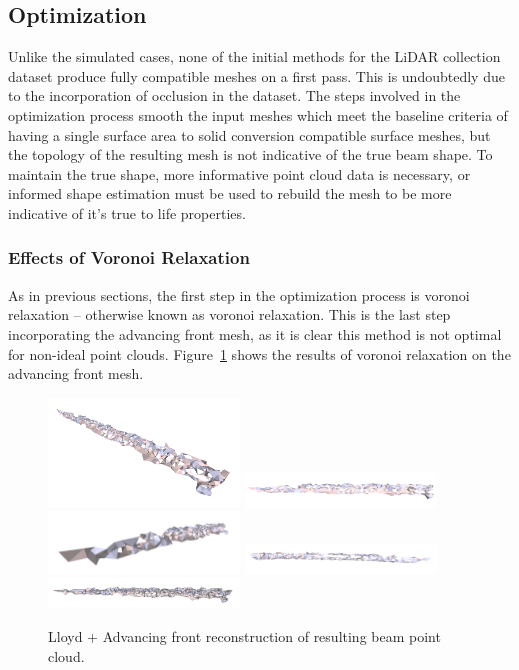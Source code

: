 \documentclass[12pt]{drexelthesis}
\let\Oldsubsection\subsection
\renewcommand{\subsection}{\FloatBarrier\Oldsubsection}
\let\Oldsubsubsection\subsubsection
\renewcommand{\subsubsection}{\FloatBarrier\Oldsubsubsection}
\begin{document}
\subsection{Optimization}

Unlike the simulated cases, none of the initial methods for the LiDAR collection dataset produce fully compatible meshes on a first pass. This is undoubtedly due to the incorporation of occlusion in the dataset. The steps involved in the optimization process smooth the input meshes which meet the baseline criteria of having a single surface area to solid conversion compatible surface meshes, but the topology of the resulting mesh is not indicative of the true beam shape. To maintain the true shape, more informative point cloud data is necessary, or informed shape estimation must be used to rebuild the mesh to be more indicative of it's true to life properties.

\subsubsection{Effects of Voronoi Relaxation}

As in previous sections, the first step in the optimization process is voronoi relaxation -- otherwise known as voronoi relaxation. This is the last step incorporating the advancing front mesh, as it is clear this method is not optimal for non-ideal point clouds. Figure~\ref{lidar:advancefrontlloyd} shows the results of voronoi relaxation on the advancing front mesh.

\begin{figure}[!ht]
	\centering
		\includegraphics[width=2in]{real-lab-scans/meshed/optimized/advancedlloyd00.png}
		\includegraphics[width=2in]{real-lab-scans/meshed/optimized/advancedlloyd01.png}
		\includegraphics[width=2in]{real-lab-scans/meshed/optimized/advancedlloyd02.png}
		\includegraphics[width=2in]{real-lab-scans/meshed/optimized/advancedlloyd03.png}
		\includegraphics[width=2in]{real-lab-scans/meshed/optimized/advancedlloyd04.png}
		\caption[Lloyd + Advancing front reconstruction of segmented LiDAR data]{\centering Lloyd + Advancing front reconstruction of resulting beam point cloud.}
	\label{lidar:advancefrontlloyd}
\end{figure}
\end{document}
